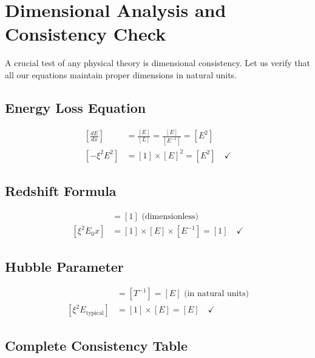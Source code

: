 \documentclass[12pt,a4paper]{article}
\begin{document}
	\section{Dimensional Analysis and Consistency Check}
	
	A crucial test of any physical theory is dimensional consistency. Let us verify that all our equations maintain proper dimensions in natural units.
	
	\subsection{Energy Loss Equation}
	
	\begin{align}
		\left[\frac{dE}{dx}\right] &= \frac{[E]}{[L]} = \frac{[E]}{[E^{-1}]} = [E^2] \\
		\left[-\xi^2 E^2\right] &= [1] \times [E]^2 = [E^2] \quad \checkmark
	\end{align}
	
	\subsection{Redshift Formula}
	
	\begin{align}
		[z] &= [1] \text{ (dimensionless)} \\
		[\xi^2 E_0 x] &= [1] \times [E] \times [E^{-1}] = [1] \quad \checkmark
	\end{align}
	
	\subsection{Hubble Parameter}
	
	\begin{align}
		[H_0] &= [T^{-1}] = [E] \text{ (in natural units)} \\
		[\xi^2 E_{\text{typical}}] &= [1] \times [E] = [E] \quad \checkmark
	\end{align}
	
	\subsection{Complete Consistency Table}
	
\end{document}

